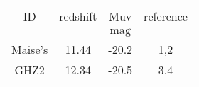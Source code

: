 \begin{table}
\begin{tabular}{cccc}
ID & redshift & Muv & reference \\
 &  & $\mathrm{mag}$ &  \\
Maise's & 11.44 & -20.2 & 1,2 \\
GHZ2 & 12.34 & -20.5 & 3,4 \\
\end{tabular}
\end{table}
